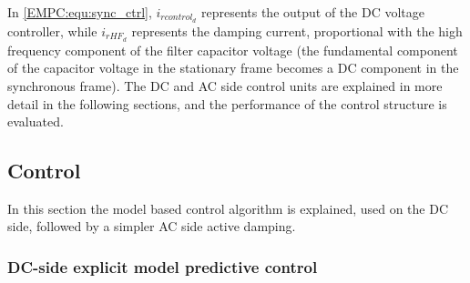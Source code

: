     In \ref{EMPC:equ:sync_ctrl}, $i_{rcontrol_d}$ represents the output of the DC voltage controller, while $i_{rHF_d}$ represents the damping current, proportional with the high frequency component of the filter capacitor voltage (the fundamental component of the capacitor voltage in the stationary frame becomes a DC component in the synchronous frame). The DC and AC side control units are explained in more detail in the following sections, and the performance of the control structure is evaluated.
		
\subsection{Control}\label{EMPC:sec:Control}

    In this section the model based control algorithm is explained, used on the DC side, followed by a simpler AC side active damping.

\subsubsection{DC-side explicit model predictive control} \label{EMPC:sec:DCside}

